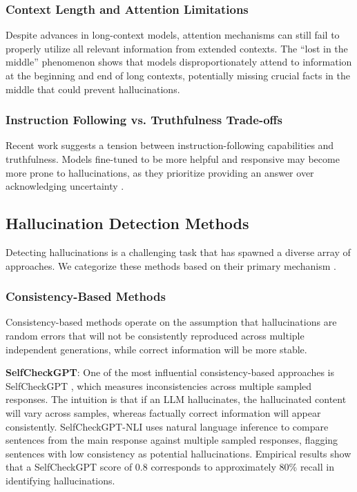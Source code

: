 \subsubsection{Context Length and Attention Limitations}

Despite advances in long-context models, attention mechanisms can still fail to properly utilize all relevant information from extended contexts. The ``lost in the middle'' phenomenon \citep{liu2023lost} shows that models disproportionately attend to information at the beginning and end of long contexts, potentially missing crucial facts in the middle that could prevent hallucinations.

\subsubsection{Instruction Following vs. Truthfulness Trade-offs}

Recent work suggests a tension between instruction-following capabilities and truthfulness. Models fine-tuned to be more helpful and responsive may become more prone to hallucinations, as they prioritize providing an answer over acknowledging uncertainty \citep{huang2023survey}.

\subsection{Hallucination Detection Methods}

Detecting hallucinations is a challenging task that has spawned a diverse array of approaches. We categorize these methods based on their primary mechanism \citep{huang2023survey,github2024awesome}.

\subsubsection{Consistency-Based Methods}

Consistency-based methods operate on the assumption that hallucinations are random errors that will not be consistently reproduced across multiple independent generations, while correct information will be more stable.

\textbf{SelfCheckGPT}: One of the most influential consistency-based approaches is SelfCheckGPT \citep{manakul2023selfcheckgpt}, which measures inconsistencies across multiple sampled responses. The intuition is that if an LLM hallucinates, the hallucinated content will vary across samples, whereas factually correct information will appear consistently. SelfCheckGPT-NLI uses natural language inference to compare sentences from the main response against multiple sampled responses, flagging sentences with low consistency as potential hallucinations. Empirical results show that a SelfCheckGPT score of 0.8 corresponds to approximately 80\% recall in identifying hallucinations.

